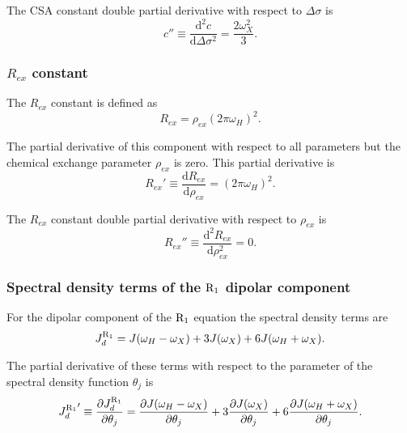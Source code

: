 \noindent The CSA constant double partial derivative with respect to $\Delta\sigma$ is
\begin{equation}
    c'' \equiv \frac{\mathrm{d}^2 c}{\mathrm{d} \Delta\sigma^2} = \frac{2 \omega_X^2}{3}. \label{eq: Ri': c"}
\end{equation}


\subsubsection{$R_{ex}$ constant}

The $R_{ex}$ constant is defined as
\begin{equation}
    R_{ex} = \rho_{ex} (2 \pi \omega_H)^2 . \label{eq: Ri': Rex}
\end{equation}

\noindent The partial derivative of this component with respect to all parameters but the chemical exchange parameter $\rho_{ex}$ is zero.  This partial derivative is
\begin{equation}
    R_{ex}' \equiv \frac{\mathrm{d} R_{ex}}{\mathrm{d} \rho_{ex}} = (2 \pi \omega_H)^2. \label{eq: Ri': Rex'}
\end{equation}

\noindent The $R_{ex}$ constant double partial derivative with respect to $\rho_{ex}$ is
\begin{equation}
    R_{ex}'' \equiv \frac{\mathrm{d}^2 R_{ex}}{\mathrm{d} \rho_{ex}^2} = 0. \label{eq: Ri': Rex"}
\end{equation}


\subsubsection{Spectral density terms of the $\mathrm{R}_1$ dipolar component}

For the dipolar component of the $\mathrm{R}_1$ equation the spectral density terms are
\begin{equation}
    J_d^{\mathrm{R}_1} = J(\omega_H - \omega_X) + 3J(\omega_X) + 6J(\omega_H + \omega_X).  \label{eq: J terms: JR1d}
\end{equation}

\noindent The partial derivative of these terms with respect to the parameter of the spectral density function $\theta_j$ is
\begin{equation}
    {J_d^{\mathrm{R}_1}}' \equiv \frac{\partial J_d^{\mathrm{R}_1}}{\partial \theta_j}
        = \frac{\partial J(\omega_H - \omega_X)}{\partial \theta_j}
        + 3 \frac{\partial J(\omega_X)}{\partial \theta_j}
        + 6 \frac{\partial J(\omega_H + \omega_X)}{\partial \theta_j}.  \label{eq: J terms: JR1d'}
\end{equation}

